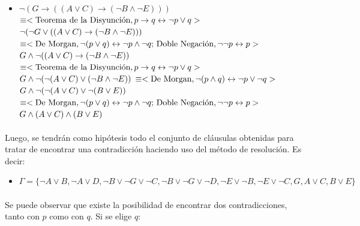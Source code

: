 \documentclass{article}
\begin{document}
\begin{itemize}
\begin{itemize}
\begin{itemize}
		\item $\neg( G \rightarrow ((A \lor C) \rightarrow (\neg B \land \neg E)))$ \\
				$\equiv < \text{Teorema de la Disyunci\'on},  
					p \rightarrow q \leftrightarrow \neg p \lor q > \\$
				$ \neg(\neg G \lor ((A \lor C) \rightarrow (\neg B \land \neg E)))\\$
				$ \equiv <\text{De Morgan}, 
					\neg(p \lor q) \leftrightarrow \neg p \land \neg q \text {; Doble Negaci\'on}, \neg \neg p \leftrightarrow p> \\ $
				$ G \land \neg((A \lor C) \rightarrow (\neg B \land \neg E))\\$
				$\equiv < \text{Teorema de la Disyunci\'on},  
					p \rightarrow q \leftrightarrow \neg p \lor q > \\$
				$ G \land \neg(\neg(A \lor C) \lor (\neg B \land \neg E))\\$
				$\equiv <\text{De Morgan}, 
					\neg(p \land q) \leftrightarrow \neg p \lor \neg q> \\$
				$ G \land \neg(\neg(A \lor C) \lor \neg(B \lor E))\\$
				$ \equiv <\text{De Morgan}, 
					\neg(p \lor q) \leftrightarrow \neg p \land \neg q \text {; Doble Negaci\'on}, \neg \neg p \leftrightarrow p> \\ $
				$ G \land (A \lor C) \land (B \lor E)\\$

		\end{itemize}				 
		
		\paragraph{}
		Luego, se tendr\'an como hip\'otesis todo el conjunto de cl\'ausulas obtenidas para tratar de encontrar una contradicci\'on haciendo uso del m\'etodo de resoluci\'on. Es decir:
		
		\begin{itemize}
		\item $\Gamma = \{\neg A \lor B,\neg A \lor D,\neg B \lor \neg G \lor \neg C ,\neg B \lor \neg G \lor \neg D,\neg E \lor \neg B, \neg E \lor \neg C, G, A \lor C, B \lor E\} $
		\end{itemize}
		
		\paragraph{}
		Se puede observar que existe la posibilidad de encontrar dos contradicciones, tanto con $p$ como con $q$. Si se elige $q$:
		

\end{itemize}
\end{itemize}
\end{document}
